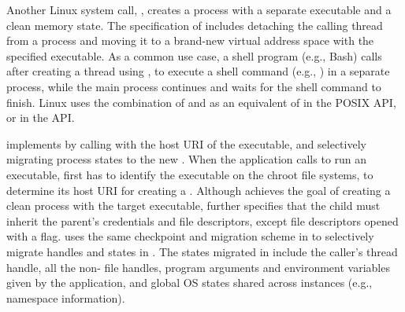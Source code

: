 Another Linux system call, , creates a process with a separate executable and a clean memory state.
The specification of 
includes detaching the calling thread from a process and moving it to a brand-new virtual address space with the specified executable.
As a common use case, a shell program (e.g., Bash) calls  after creating a thread using ,
to execute a shell command (e.g., ) in a separate process, while the main process continues and waits for the shell command to finish.
Linux uses the combination of  and 
as an equivalent of  in the POSIX API, or  in the \win{} API.


\thelibos{} implements  by calling  with
the host URI of the executable,
and selectively migrating process states to the new \picoproc{}.
When the application calls  to run an executable, \thelibos{} first has to identify the executable on the chroot file systems,
to determine its host URI for creating a \picoproc{}.
Although  achieves the goal of creating a clean process with the target executable,
 further specifies that the child must inherit the parent's credentials and file descriptors, except file descriptors opened with a  flag.
\thelibos{} uses the same checkpoint and migration scheme in  to selectively migrate handles and \libos{} states in .
The states migrated in 
include the caller's thread handle, all the non- file handles, program arguments and environment variables given by the application, and global OS states shared across \thelibos{} instances
(e.g., namespace information).



